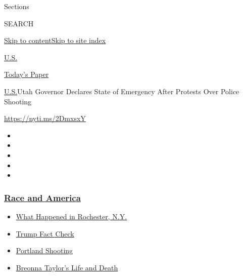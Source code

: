 Sections

SEARCH

\protect\hyperlink{site-content}{Skip to
content}\protect\hyperlink{site-index}{Skip to site index}

\href{https://www.nytimes3xbfgragh.onion/section/us}{U.S.}

\href{https://myaccount.nytimes3xbfgragh.onion/auth/login?response_type=cookie\&client_id=vi}{}

\href{https://www.nytimes3xbfgragh.onion/section/todayspaper}{Today's
Paper}

\href{/section/us}{U.S.}\textbar{}Utah Governor Declares State of
Emergency After Protests Over Police Shooting

\url{https://nyti.ms/2DmxsxY}

\begin{itemize}
\item
\item
\item
\item
\item
\end{itemize}

\hypertarget{race-and-america}{%
\subsubsection{\texorpdfstring{\href{https://www.nytimes3xbfgragh.onion/news-event/george-floyd-protests-minneapolis-new-york-los-angeles?name=styln-george-floyd\&region=TOP_BANNER\&block=storyline_menu_recirc\&action=click\&pgtype=Article\&impression_id=8cee72e0-f289-11ea-b04d-a5ac28b9dfff\&variant=undefined}{Race
and America}}{Race and America}}\label{race-and-america}}

\begin{itemize}
\tightlist
\item
  \href{https://www.nytimes3xbfgragh.onion/2020/09/04/nyregion/rochester-police-daniel-prude.html?name=styln-george-floyd\&region=TOP_BANNER\&block=storyline_menu_recirc\&action=click\&pgtype=Article\&impression_id=8cee72e1-f289-11ea-b04d-a5ac28b9dfff\&variant=undefined}{What
  Happened in Rochester, N.Y.}
\item
  \href{https://www.nytimes3xbfgragh.onion/2020/09/01/us/politics/trump-fact-check-protests.html?name=styln-george-floyd\&region=TOP_BANNER\&block=storyline_menu_recirc\&action=click\&pgtype=Article\&impression_id=8cee72e2-f289-11ea-b04d-a5ac28b9dfff\&variant=undefined}{Trump
  Fact Check}
\item
  \href{https://www.nytimes3xbfgragh.onion/2020/08/30/us/portland-shooting-explained.html?name=styln-george-floyd\&region=TOP_BANNER\&block=storyline_menu_recirc\&action=click\&pgtype=Article\&impression_id=8cee99f0-f289-11ea-b04d-a5ac28b9dfff\&variant=undefined}{Portland
  Shooting}
\item
  \href{https://www.nytimes3xbfgragh.onion/2020/08/30/us/breonna-taylor-police-killing.html?name=styln-george-floyd\&region=TOP_BANNER\&block=storyline_menu_recirc\&action=click\&pgtype=Article\&impression_id=8cee99f1-f289-11ea-b04d-a5ac28b9dfff\&variant=undefined}{Breonna
  Taylor's Life and Death}
\end{itemize}

